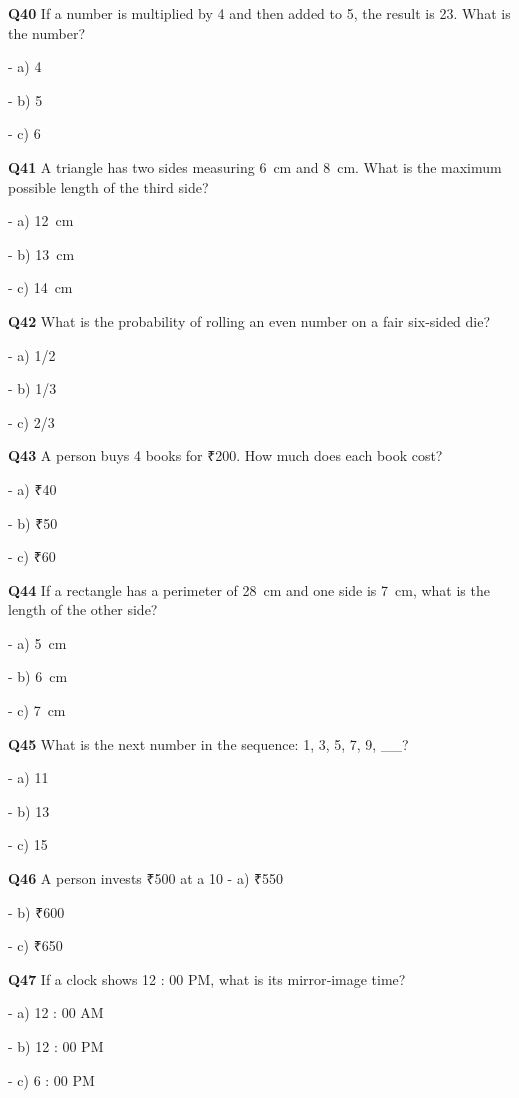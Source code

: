 \textbf{Q40} If a number is multiplied by 4 and then added to 5, the result is 23. What is the number?\par
\quad - a) 4\par
\quad - b) 5\par
\quad - c) 6\par

\textbf{Q41} A triangle has two sides measuring 6 cm and 8 cm. What is the maximum possible length of the third side?\par
\quad - a) 12 cm\par
\quad - b) 13 cm\par
\quad - c) 14 cm\par

\textbf{Q42} What is the probability of rolling an even number on a fair six‑sided die?\par
\quad - a) 1/2\par
\quad - b) 1/3\par
\quad - c) 2/3\par

\textbf{Q43} A person buys 4 books for ₹200. How much does each book cost?\par
\quad - a) ₹40\par
\quad - b) ₹50\par
\quad - c) ₹60\par

\textbf{Q44} If a rectangle has a perimeter of 28 cm and one side is 7 cm, what is the length of the other side?\par
\quad - a) 5 cm\par
\quad - b) 6 cm\par
\quad - c) 7 cm\par

\textbf{Q45} What is the next number in the sequence: 1, 3, 5, 7, 9, __?\par
\quad - a) 11\par
\quad - b) 13\par
\quad - c) 15\par

\textbf{Q46} A person invests ₹500 at a 10 %
\quad - a) ₹550\par
\quad - b) ₹600\par
\quad - c) ₹650\par

\textbf{Q47} If a clock shows 12 : 00 PM, what is its mirror‑image time?\par
\quad - a) 12 : 00 AM\par
\quad - b) 12 : 00 PM\par
\quad - c) 6 : 00 PM\par

